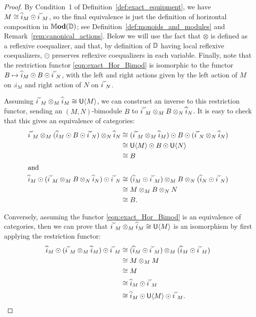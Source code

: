 \documentclass[11pt,oneside,article]{memoir}
\begin{document}
\begin{proof}
  By Condition~1 of Definition~\ref{def:exact_equipment}, we have $M\iso\comp{i}_M\odot\conj{i}_M$,
  so the final equivalence is just the definition of horizontal composition in $\mathbb{M}\mathbf{od}(\mathbb{D})$;
  see Definition~\ref{def:monoids_and_modules} and Remark~\ref{rem:canonical_actions}. Below we will
  use the fact that $\otimes$ is defined as a reflexive
  coequalizer, and that, by definition of $\mathbb{D}$ having local reflexive coequalizers, $\odot$
  preserves reflexive coequalizers in each variable. Finally, note that the restriction functor \eqref{eqn:exact_Hor_Bimod} is isomorphic
  to the functor $B\mapsto\comp{i}_M\odot B\odot\conj{i}_N$, with the left and right actions given
  by the left action of $M$ on $\comp{i}_M$ and right action of $N$ on $\conj{i}_N$.

  Assuming $\conj{i}_M\otimes_M\comp{i}_M\iso\unit\Col{M}$, we can construct an inverse to this
  restriction functor, sending an $(M,N)$-bimodule $B$ to $\conj{i}_M\otimes_M
  B\otimes_N\comp{i}_N$. It is easy to check that this gives an equivalence of categories:
  \begin{align*}
    \conj{i}_M\otimes_M (\comp{i}_M\odot B\odot\conj{i}_N)\otimes_N\comp{i}_N
      &\iso (\conj{i}_M\otimes_M\comp{i}_M)\odot B\odot (\conj{i}_N\otimes_N\comp{i}_N) \\
      &\iso \unit\Col{M}\odot B\odot \unit\Col{N} \\
      &\iso B \\
    \intertext{and}
    \comp{i}_M\odot (\conj{i}_M\otimes_M B\otimes_N\comp{i}_N)\odot \conj{i}_N
      &\iso (\comp{i}_M\odot\conj{i}_M)\otimes_M B\otimes_N (\comp{i}_N\odot\conj{i}_N) \\
      &\iso M\otimes_M B\otimes_N N \\
      &\iso B.
  \end{align*}

  Conversely, assuming the functor \eqref{eqn:exact_Hor_Bimod} is an equivalence of categories, then
  we can prove that $\conj{i}_M\otimes_M\comp{i}_M\iso\unit\Col{M}$ is an isomorphism by first
  applying the restriction functor:
  \begin{align*}
    \comp{i}_M\odot(\conj{i}_M\otimes_M\comp{i}_M)\odot\conj{i}_M
      &\iso (\comp{i}_M\odot\conj{i}_M)\otimes_M(\comp{i}_M\odot\conj{i}_M) \\
      &\iso M\otimes_M M \\
      &\iso M \\
      &\iso \comp{i}_M\odot\conj{i}_M \\
      &\iso \comp{i}_M\odot\unit\Col{M}\odot\conj{i}_M. \qedhere
  \end{align*}
\end{proof}
\end{document}
